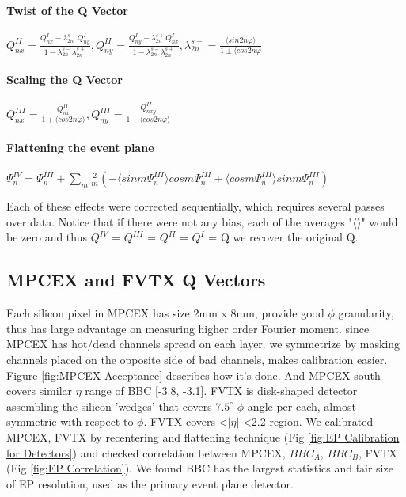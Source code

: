 \documentclass{article}
\begin{document}
\paragraph{Twist of the Q Vector}
\label{paragraph:Twist of the Q Vector}
\begin{center}
\large
$Q_{nx}^{II} = \frac{Q_{nx}^{I} - \lambda_{2n}^{s-}Q_{ny}^{I} }{1-\lambda_{2n}^{s-}\lambda_{2n}^{s+}}, Q_{ny}^{II} = \frac{Q_{ny}^{I} - \lambda_{2n}^{s+}Q_{nx}^{I} }{1-\lambda_{2n}^{s-}\lambda_{2n}^{s+}}, \lambda_{2n}^{s\pm} = \frac{\langle sin 2n\varphi \rangle}{1 \pm \langle cos 2n\varphi}$
\end{center}
\paragraph{Scaling the Q Vector}
\label{paragraph:Scaling the Q Vector}
\begin{center}
\large
$Q_{nx}^{III} = \frac{Q_{nx}^{II}}{1+\langle cos 2n\varphi \rangle}, Q_{ny}^{III} = \frac{Q_{nxy}^{II}}{1+\langle cos 2n\varphi \rangle}$
\end{center}

\paragraph{Flattening the event plane}
\label{paragraph:Flattening of the Q Vector}
\begin{center}
$\Psi_{n}^{IV} = \Psi_{n}^{III} + \sum_{m} \frac{2}{m}(-\langle sin m\Psi_{n}^{III} \rangle cos m\Psi_{n}^{III} + \langle cos m\Psi_{n}^{III} \rangle sin m \Psi_{n}^{III})$
\end{center}
\par
Each of these effects were corrected sequentially, which requires several passes over data.
Notice that if there were not any bias, each of the averages "$\langle$$\rangle$" would be zero and 
thus $Q^{IV}$ = $Q^{III}$ = $Q^{II}$ = $Q^{I}$ = Q we recover the original Q.
\subsection{MPCEX and FVTX Q Vectors}
\label{subsection:MPCEX and FVTX Q Vectors}
Each silicon pixel in MPCEX has size 2mm x 8mm, provide good $\phi$ granularity, thus has large advantage on measuring higher order 
Fourier moment. since MPCEX has hot/dead channels spread on each layer. we symmetrize by masking channels placed on the opposite side of 
bad channels, makes calibration easier. Figure \ref{fig:MPCEX Acceptance} describes how it's done. And MPCEX south covers similar $\eta$ range of BBC [-3.8, -3.1].
FVTX is disk-shaped detector assembling the silicon 'wedges' that covers $7.5^{\circ}$ $\phi$ angle per each, almost symmetric 
with respect to $\phi$.
FVTX covers \textless  $\vert \eta \vert$ \textless 2.2 region.
We calibrated MPCEX, FVTX by recentering and flattening technique (Fig \ref{fig:EP Calibration for Detectors}) and checked correlation between MPCEX, $BBC_{A}$, $BBC_{B}$, 
FVTX (Fig \ref{fig:EP Correlation}). We found BBC has the largest statistics and fair size of EP resolution, used as the primary event plane detector.
\newline
\end{document}
